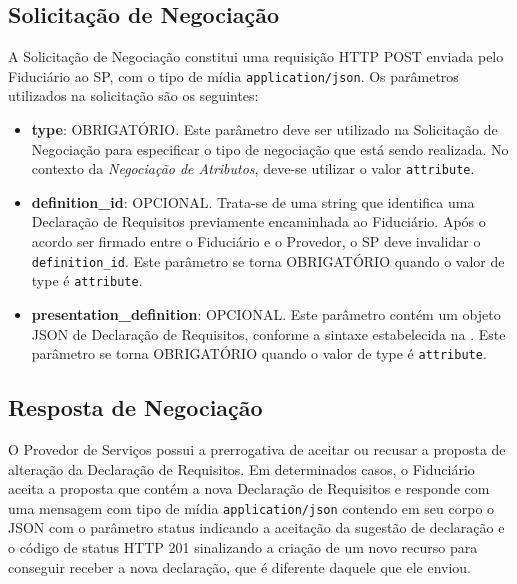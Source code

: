 

\subsection{Solicitação de Negociação}\label{subsection:negotiation-request}

A Solicitação de Negociação constitui uma requisição HTTP POST enviada pelo Fiduciário ao \acs{SP}, com o tipo de mídia \texttt{application/json}. Os parâmetros utilizados na solicitação são os seguintes:



\begin{itemize}

    \item \textbf{type}: OBRIGATÓRIO. Este parâmetro deve ser utilizado na Solicitação de Negociação para especificar o tipo de negociação que está sendo realizada. No contexto da \emph{Negociação de Atributos}, deve-se utilizar o valor \texttt{attribute}.

    \item \textbf{definition\_id}: OPCIONAL. Trata-se de uma string que identifica uma Declaração de Requisitos previamente encaminhada ao Fiduciário. Após o acordo ser firmado entre o Fiduciário e o Provedor, o \acs{SP} deve invalidar o \texttt{definition\_id}. Este parâmetro se torna OBRIGATÓRIO quando o valor de type é \texttt{attribute}.
    
    \item \textbf{presentation\_definition}: OPCIONAL. Este parâmetro contém um objeto JSON de Declaração de Requisitos, conforme a sintaxe estabelecida na \cite{presentation-exchange}. Este parâmetro se torna OBRIGATÓRIO quando o valor de type é \texttt{attribute}.
    
\end{itemize}

\subsection{Resposta de Negociação}

O Provedor de Serviços possui a prerrogativa de aceitar ou recusar a proposta de alteração da Declaração de Requisitos. Em determinados casos, o Fiduciário aceita a proposta que contém a nova Declaração de Requisitos e responde com uma mensagem com tipo de mídia \texttt{application/json} contendo em seu corpo o \acs{JSON} com o parâmetro status indicando a aceitação da sugestão de declaração e o código de status HTTP 201 sinalizando a criação de um novo recurso para conseguir receber a nova declaração, que é diferente daquele que ele enviou. 

